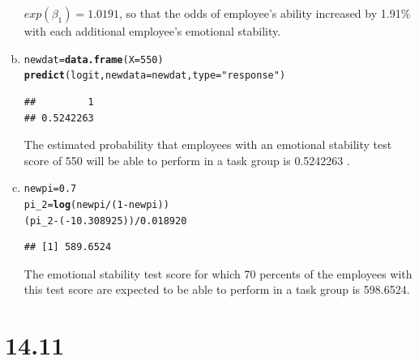 \documentclass{article}\usepackage[]{graphicx}\usepackage[]{color}
\makeatletter
\newcommand{\hlnum}[1]{\textcolor[rgb]{0.686,0.059,0.569}{#1}}%
\newcommand{\hlstr}[1]{\textcolor[rgb]{0.192,0.494,0.8}{#1}}%
\newcommand{\hlopt}[1]{\textcolor[rgb]{0,0,0}{#1}}%
\newcommand{\hlstd}[1]{\textcolor[rgb]{0.345,0.345,0.345}{#1}}%
\newcommand{\hlkwb}[1]{\textcolor[rgb]{0.69,0.353,0.396}{#1}}%
\newcommand{\hlkwc}[1]{\textcolor[rgb]{0.333,0.667,0.333}{#1}}%
\newcommand{\hlkwd}[1]{\textcolor[rgb]{0.737,0.353,0.396}{\textbf{#1}}}%
\newenvironment{kframe}{%
 \def\at@end@of@kframe{}%
 \ifinner\ifhmode%
  \def\at@end@of@kframe{\end{minipage}}%
  \begin{minipage}{\columnwidth}%
 \fi\fi%
 \def\FrameCommand##1{\hskip\@totalleftmargin \hskip-\fboxsep
 \colorbox{shadecolor}{##1}\hskip-\fboxsep
     \hskip-\linewidth \hskip-\@totalleftmargin \hskip\columnwidth}%
 \MakeFramed {\advance\hsize-\width
   \@totalleftmargin\z@ \linewidth\hsize
   \@setminipage}}%
 {\par\unskip\endMakeFramed%
 \at@end@of@kframe}
\newenvironment{knitrout}{}{} %
\makeatother
\begin{document}
\begin{enumerate}[(a)]
\qquad $exp(\beta_1)=1.0191$, so that the odds of employee's ability increased by 1.91\% with each additional employee's emotional stability.

\item

\begin{knitrout}
\color{fgcolor}\begin{kframe}
\begin{alltt}
  \hlstd{newdat} \hlkwb{=} \hlkwd{data.frame}\hlstd{(}\hlkwc{X} \hlstd{=} \hlnum{550}\hlstd{)}
  \hlkwd{predict}\hlstd{(logit,} \hlkwc{newdata} \hlstd{= newdat,} \hlkwc{type} \hlstd{=} \hlstr{"response"}\hlstd{)}
\end{alltt}
\begin{verbatim}
##         1 
## 0.5242263
\end{verbatim}
\end{kframe}
\end{knitrout}

\qquad The estimated probability that employees with an emotional stability test score of 550 will be able to perform in a task group is 0.5242263 .

\item

\begin{knitrout}
\color{fgcolor}\begin{kframe}
\begin{alltt}
  \hlstd{newpi} \hlkwb{=} \hlnum{0.7}
  \hlstd{pi_2} \hlkwb{=} \hlkwd{log}\hlstd{(newpi}\hlopt{/}\hlstd{(}\hlnum{1}\hlopt{-}\hlstd{newpi))}
  \hlstd{(pi_2} \hlopt{-} \hlstd{(}\hlopt{-}\hlnum{10.308925}\hlstd{))}\hlopt{/}\hlnum{0.018920}
\end{alltt}
\begin{verbatim}
## [1] 589.6524
\end{verbatim}
\end{kframe}
\end{knitrout}

\qquad The emotional stability test score for which 70 percents of the employees with this test score are expected to be able to  perform in a task group is 598.6524.

\end{enumerate}

\section{14.11}
\end{document}
